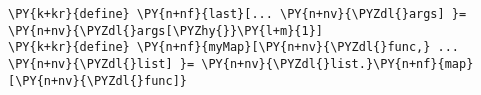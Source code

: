 \begin{Verbatim}[commandchars=\\\{\}]
\PY{k+kr}{define} \PY{n+nf}{last}[... \PY{n+nv}{\PYZdl{}args] }= \PY{n+nv}{\PYZdl{}args[\PYZhy{}}\PY{l+m}{1}]
\PY{k+kr}{define} \PY{n+nf}{myMap}[\PY{n+nv}{\PYZdl{}func,} ... \PY{n+nv}{\PYZdl{}list] }= \PY{n+nv}{\PYZdl{}list.}\PY{n+nf}{map}[\PY{n+nv}{\PYZdl{}func]}
\end{Verbatim}
